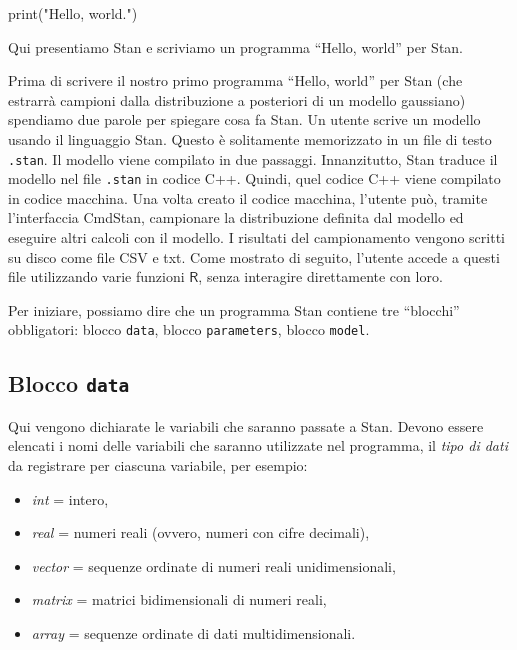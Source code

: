 \documentclass[
  11pt,
]{krantz}
\makeatletter
\newenvironment{Shaded}{\begin{snugshade}}{\end{snugshade}}
\newcommand{\BuiltInTok}[1]{#1}
\newcommand{\NormalTok}[1]{#1}
\newcommand{\StringTok}[1]{\textcolor[rgb]{0.5,0.5,0.5}{#1}}
\providecommand{\tightlist}{%
  \setlength{\itemsep}{0pt}\setlength{\parskip}{0pt}}
\newenvironment{kframe}{%
\medskip{}
\setlength{\fboxsep}{.8em}
 \def\at@end@of@kframe{}%
 \ifinner\ifhmode%
  \def\at@end@of@kframe{\end{minipage}}%
  \begin{minipage}{\columnwidth}%
 \fi\fi%
 \def\FrameCommand##1{\hskip\@totalleftmargin \hskip-\fboxsep
 \colorbox{shadecolor}{##1}\hskip-\fboxsep
     \hskip-\linewidth \hskip-\@totalleftmargin \hskip\columnwidth}%
 \MakeFramed {\advance\hsize-\width
   \@totalleftmargin\z@ \linewidth\hsize
   \@setminipage}}%
 {\par\unskip\endMakeFramed%
 \at@end@of@kframe}
\renewenvironment{Shaded}{\begin{kframe}}{\end{kframe}}
\newcommand{\R}{\textsf{R}} %
\theoremstyle{definition}
\theoremstyle{definition}
\theoremstyle{definition}
\theoremstyle{definition}
\theoremstyle{remark}
\makeatother
\begin{document}
\begin{Shaded}
\begin{Highlighting}[]
\BuiltInTok{print}\NormalTok{(}\StringTok{"Hello, world."}\NormalTok{)}
\end{Highlighting}
\end{Shaded}

Qui presentiamo Stan e scriviamo un programma ``Hello, world'' per Stan.

Prima di scrivere il nostro primo programma ``Hello, world'' per Stan (che estrarrà campioni dalla distribuzione a posteriori di un modello gaussiano) spendiamo due parole per spiegare cosa fa Stan. Un utente scrive un modello usando il linguaggio Stan. Questo è solitamente memorizzato in un file di testo \texttt{.stan}. Il modello viene compilato in due passaggi. Innanzitutto, Stan traduce il modello nel file \texttt{.stan} in codice C++. Quindi, quel codice C++ viene compilato in codice macchina. Una volta creato il codice macchina, l'utente può, tramite l'interfaccia CmdStan, campionare la distribuzione definita dal modello ed eseguire altri calcoli con il modello. I risultati del campionamento vengono scritti su disco come file CSV e txt. Come mostrato di seguito, l'utente accede a questi file utilizzando varie funzioni \(\R\), senza interagire direttamente con loro.

Per iniziare, possiamo dire che un programma Stan contiene tre ``blocchi'' obbligatori: blocco \texttt{data}, blocco \texttt{parameters}, blocco \texttt{model}.

\hypertarget{blocco-data}{%
\subsection{\texorpdfstring{Blocco \texttt{data}}{Blocco data}}\label{blocco-data}}

Qui vengono dichiarate le variabili che saranno passate a Stan. Devono essere elencati i nomi delle variabili che saranno utilizzate nel programma, il \emph{tipo di dati} da registrare per ciascuna variabile, per esempio:

\begin{itemize}
\tightlist
\item
  \emph{int} = intero,
\item
  \emph{real} = numeri reali (ovvero, numeri con cifre decimali),
\item
  \emph{vector} = sequenze ordinate di numeri reali unidimensionali,
\item
  \emph{matrix} = matrici bidimensionali di numeri reali,
\item
  \emph{array} = sequenze ordinate di dati multidimensionali.
\end{itemize}
\end{document}
